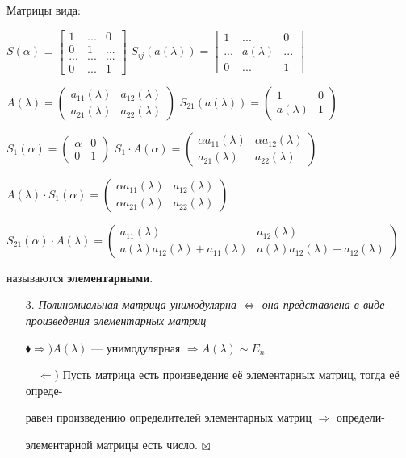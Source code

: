 \documentclass[a4paper, 12pt]{report}
\begin{document}
	Матрицы вида:
	\par\bigskip
	$S(\alpha)$ = $\begin{bmatrix} 1 & ... & 0 \\ 0 & 1 & ... \\ ... & ... & ... \\ 0 & ... & 1 \end{bmatrix}$ \quad
	$S_{ij}(a(\lambda)) = \begin{bmatrix} 1 & ... & 0 \\ ... & a(\lambda)  & ... \\ 0 & ... & 1 \end{bmatrix}$
	
	$A(\lambda) = \begin{pmatrix} a_{11}(\lambda) & a_{12}(\lambda) \\ a_{21}(\lambda) & a_{22}(\lambda) \end{pmatrix}$ \quad $S_{21}(a(\lambda)) = \begin{pmatrix} 1 & 0 \\ a(\lambda) & 1 \end{pmatrix}$
	
	$S_1(\alpha) = \begin{pmatrix} \alpha & 0 \\ 0 & 1 \end{pmatrix}$ \quad $S_1 \cdot A(\alpha) = \begin{pmatrix} \alpha a_{11}(\lambda) &  \alpha a_{12}(\lambda) \\ a_{21}(\lambda) & a_{22}(\lambda) \end{pmatrix}$
	
	$A(\lambda) \cdot S_1(\alpha) = \begin{pmatrix} \alpha a_{11}(\lambda) & a_{12}(\lambda) \\ \alpha a_{21}(\lambda) & a_{22}(\lambda) \end{pmatrix}$
	
	$S_{21}(\alpha) \cdot A(\lambda) = \begin{pmatrix} a_{11}(\lambda) & a_{12}(\lambda) \\ a(\lambda)a_{12}(\lambda) + a_{11}(\lambda) & a(\lambda)a_{12}(\lambda) + a_{12}(\lambda) \end{pmatrix}$
	\par\bigskip
	называются \textbf{элементарными}.
	\par\bigskip
	\begin{enumerate}
		\item[3.] \textit{Полиномиальная матрица унимодулярна $\Longleftrightarrow$ она представлена в виде произведения
			элементарных матриц}
		
		$\blacklozenge \Rightarrow ) A(\lambda)$ --- унимодулярная $\Longrightarrow A(\lambda) \sim E_n$
		
		$\quad \Leftarrow$) Пусть матрица есть произведение её элементарных матриц, тогда её опреде-
		
		 равен произведению определителей элементарных матриц $\Longrightarrow$ определи-
		
		 элементарной матрицы есть число. \quad $\boxtimes$
	\end{enumerate}
	
\end{document}
